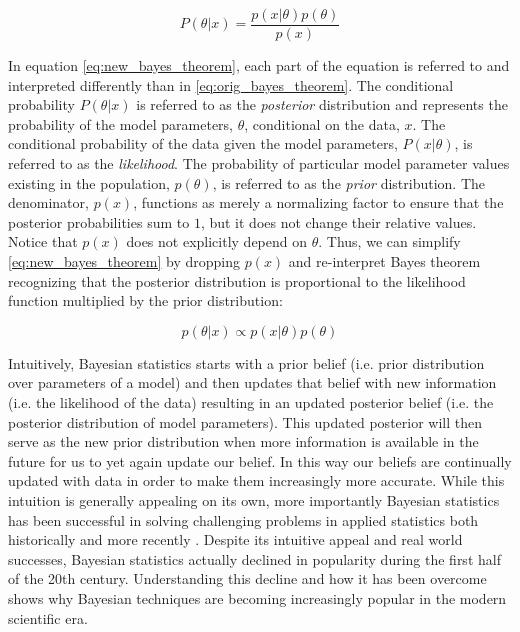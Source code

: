 \begin{equation} \label{eq:new_bayes_theorem}
P(\theta|x) = \frac{p(x|\theta)p(\theta)}{p(x)}
\end{equation}

In equation \ref{eq:new_bayes_theorem}, each part of the equation is referred to and interpreted differently than in \ref{eq:orig_bayes_theorem}. The conditional probability $P(\theta|x)$ is referred to as the \textit{posterior} distribution and represents the probability of the model parameters, $\theta$, conditional on the data, $x$. The conditional probability of the data given the model parameters, $P(x|\theta)$, is referred to as the \textit{likelihood}. The probability of particular model parameter values existing in the population, $p(\theta)$, is referred to as the \textit{prior} distribution. The denominator, $p(x)$, functions as merely a normalizing factor to ensure that the posterior probabilities sum to $1$, but it does not change their relative values. Notice that $p(x)$ does not explicitly depend on $\theta$. Thus, we can simplify \ref{eq:new_bayes_theorem} by dropping $p(x)$ and re-interpret Bayes theorem recognizing that the posterior distribution is proportional to the likelihood function multiplied by the prior distribution:

\begin{equation} \label{eq:proportional_bayes_theorem}
p(\theta|x) \propto p(x|\theta)p(\theta)
\end{equation}

Intuitively, Bayesian statistics starts with a prior belief (i.e. prior distribution over parameters of a model) and then updates that belief with new information (i.e. the likelihood of the data) resulting in an updated posterior belief (i.e. the posterior distribution of model parameters). This updated posterior will then serve as the new prior distribution when more information is available in the future for us to yet again update our belief. In this way our beliefs are continually updated with data in order to make them increasingly more accurate. While this intuition is generally appealing on its own, more importantly Bayesian statistics has been successful in solving challenging problems in applied statistics both historically and more recently \cite{Schoot2021}. Despite its intuitive appeal and real world successes, Bayesian statistics actually declined in popularity during the first half of the 20th century. Understanding this decline and how it has been overcome shows why Bayesian techniques are becoming increasingly popular in the modern scientific era.

